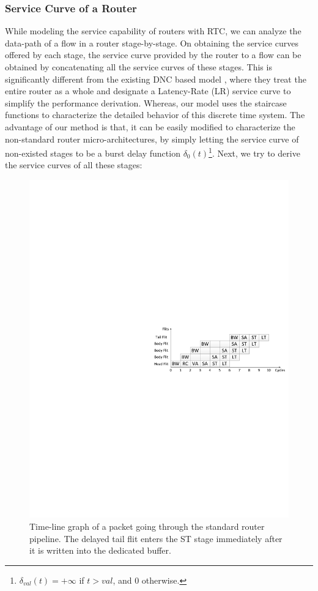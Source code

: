 \documentclass[10pt,journal]{IEEEtran}
\begin{document}
\subsubsection{Service Curve of a Router}\label{router}
While modeling the service capability of routers with RTC, we can analyze the data-path of a flow in a router stage-by-stage. On obtaining the service curves offered by each stage, the service curve provided by the router to a flow can be obtained by concatenating all the service curves of these stages. This is significantly different from the existing DNC based model \cite{qian2009analysis,Qian489900}, where they treat the entire router as a whole and designate a Latency-Rate (LR) service curve \cite{Boudec2001Network} to simplify the performance derivation. Whereas, our model uses the staircase functions to characterize the detailed behavior of this discrete time system. The advantage of our method is that, it can be easily modified to characterize the non-standard router micro-architectures, by simply letting the service curve of non-existed stages to be a burst delay function $\delta_0(t)$\footnote{$\delta_{val}(t)=+\infty$ if $t>val$, and 0 otherwise.}. Next, we try to derive the service curves of all these stages:
\begin{figure}
  \centering
  \includegraphics[scale=0.35]{figures/Pipeline.pdf}
  \caption{Time-line graph of a packet going through the standard router pipeline. The delayed tail flit enters the ST stage immediately after it is written into the dedicated buffer.}\label{pipeline}
\end{figure}
\end{document}
